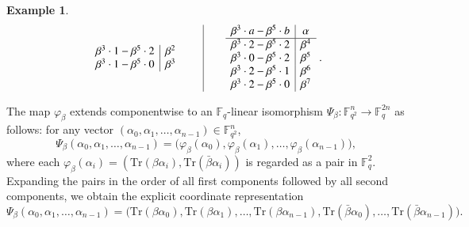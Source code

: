\documentclass{aims}
\numberwithin{equation}{section}
\theoremstyle{definition}
\newtheorem{example}[theorem]{Example}
\newcommand{\F}{\mathbb{F}}
\newcommand{\Tr}{\mathrm{Tr}}
\begin{document}
\begin{example}
\[\begin{array}{c|c}
		\beta^3 \cdot 1 - \beta^5 \cdot 2 & \beta^2 \\
		\beta^3 \cdot 1 - \beta^5 \cdot 0 & \beta^3
	\end{array}
	\hspace{0.7cm}\vrule\hspace{0.7cm}
	\begin{array}{c|c}
		\beta^3 \cdot a - \beta^5 \cdot b & \alpha \\ \hline
		\beta^3 \cdot 2 - \beta^5 \cdot 2 & \beta^4 \\
		\beta^3 \cdot 0 - \beta^5 \cdot 2 & \beta^5 \\
		\beta^3 \cdot 2 - \beta^5 \cdot 1 & \beta^6 \\
		\beta^3 \cdot 2 - \beta^5 \cdot 0 & \beta^7
	\end{array}~.
	\]
\end{example}


The map $\varphi_\beta$ extends componentwise to an $\F_q$-linear isomorphism $\Psi_\beta: \F_{q^2}^n \to \F_q^{2n}$ as follows: for any vector $(\alpha_0, \alpha_1, \ldots, \alpha_{n-1}) \in \F_{q^2}^n$,
\begin{equation*}
	\Psi_\beta(\alpha_0, \alpha_1, \ldots, \alpha_{n-1}) = \bigl( \varphi_\beta(\alpha_0), \varphi_\beta(\alpha_1), \ldots, \varphi_\beta(\alpha_{n-1}) \bigr),
\end{equation*}
where each $\varphi_\beta(\alpha_i) = (\Tr(\beta\alpha_i), \Tr(\bar{\beta}\alpha_i))$ is regarded as a pair in $\F_q^2$. Expanding the pairs in the order of all first components followed by all second components, we obtain the explicit coordinate representation
\begin{equation}\label{eq2-exp}
	\Psi_\beta(\alpha_0,\alpha_1,\ldots,\alpha_{n-1}) = \bigl(\Tr(\beta\alpha_0),\Tr(\beta\alpha_1),\ldots,\Tr(\beta\alpha_{n-1}),\Tr(\bar{\beta}\alpha_0),\ldots,\Tr(\bar{\beta}\alpha_{n-1})\bigr).
\end{equation}
\end{document}
